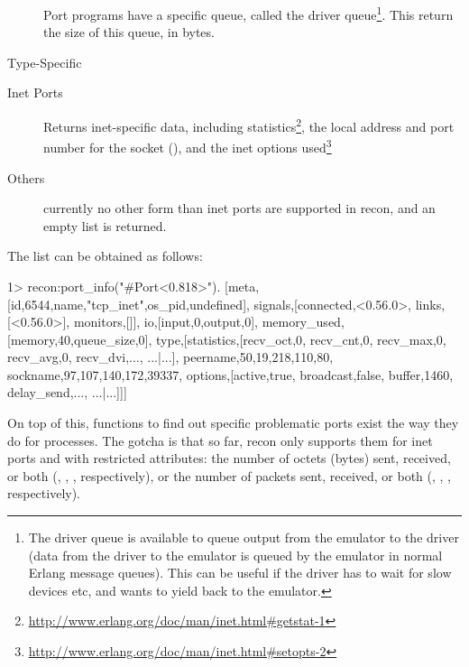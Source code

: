 \begin{description*}
\begin{description}
			\item[] Port programs have a specific queue, called the driver queue\footnote{The driver queue is available to queue output from the emulator to the driver (data from the driver to the emulator is queued by the emulator in normal Erlang message queues). This can be useful if the driver has to wait for slow devices etc, and wants to yield back to the emulator.}. This return the size of this queue, in bytes.
		\end{description}
		
	\item[Type-Specific] \hfill
		\begin{description}		
			\item[Inet Ports] Returns inet-specific data, including statistics\footnote{\href{http://www.erlang.org/doc/man/inet.html\#getstat-1}{http://www.erlang.org/doc/man/inet.html\#getstat-1}}, the local address and port number for the socket (), and the inet options used\footnote{\href{http://www.erlang.org/doc/man/inet.html\#setopts-2}{http://www.erlang.org/doc/man/inet.html\#setopts-2}}
			\item[Others] currently no other form than inet ports are supported in recon, and an empty list is returned.
		\end{description}
\end{description*}
		
The list can be obtained as follows:

\begin{VerbatimEshell}
1> recon:port_info("#Port<0.818>").
[{meta,[{id,6544},{name,"tcp_inet"},{os_pid,undefined}]},
 {signals,[{connected,<0.56.0>},
           {links,[<0.56.0>]},
           {monitors,[]}]},
 {io,[{input,0},{output,0}]},
 {memory_used,[{memory,40},{queue_size,0}]},
 {type,[{statistics,[{recv_oct,0},
                     {recv_cnt,0},
                     {recv_max,0},
                     {recv_avg,0},
                     {recv_dvi,...},
                     {...}|...]},
        {peername,{{50,19,218,110},80}},
        {sockname,{{97,107,140,172},39337}},
        {options,[{active,true},
                  {broadcast,false},
                  {buffer,1460},
                  {delay_send,...},
                  {...}|...]}]}]
\end{VerbatimEshell}
		
On top of this, functions to find out specific problematic ports exist the way they do for processes. The gotcha is that so far, recon only supports them for inet ports and with restricted attributes: the number of octets (bytes) sent, received, or both (, , , respectively), or the number of packets sent, received, or both (, , , respectively).

